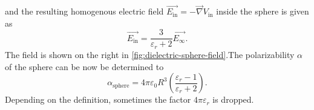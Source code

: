 and the resulting  homogenous electric field $\vec{E_\mathrm{in}} = -\vec{\nabla} V_\mathrm{in}$ inside the sphere is given as
\begin{equation}
  \vec{E_\mathrm{in}} = \frac{3}{\varepsilon_r + 2} \vec{E_\infty} .
\end{equation}
The field is shown on the right in \cref{fig:dielectric-sphere-field}.The polarizability $\alpha$ of the sphere can be now be determined to
\begin{equation}
  \alpha_\mathrm{sphere} = 4\pi \varepsilon_0 R^3 \left(\frac{\varepsilon_r - 1}{\varepsilon_r + 2}\right).
\end{equation}
Depending on the definition, sometimes the factor $4\pi\varepsilon_r$ is dropped.

